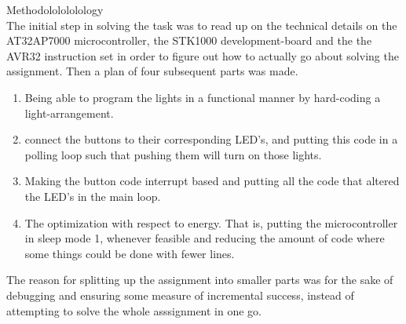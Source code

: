 Methodololololology\\
The initial step in solving the task was to read up on the technical details on the AT32AP7000 microcontroller, the STK1000 development-board and the the AVR32 instruction set in order to figure out how to actually go about solving the assignment. Then a plan of four subsequent parts was made.
\begin{enumerate}
\item{Being able to program the lights in a functional manner by hard-coding a light-arrangement.}
\item{connect the buttons to their corresponding LED's, and putting this code in a polling loop such that pushing them will turn on those lights.}
\item{Making the button code interrupt based and putting all the code that altered the LED's in the main loop.}
\item{The optimization with respect to energy. That is, putting the microcontroller in sleep mode 1, whenever feasible and reducing the amount of code where some things could be done with fewer lines.}
\end{enumerate}
The reason for splitting up the assignment into smaller parts was for the sake of debugging and ensuring some measure of incremental success, instead of attempting to solve the whole asssignment in one go.


